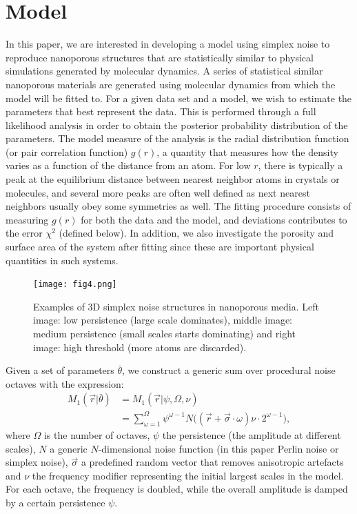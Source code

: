 \documentclass[aps,pre,twocolumn,letterpaper,floatfix,showpacs]{revtex4}
\begin{document}
\section{Model}
In this paper, we are interested in developing a model using simplex noise to reproduce
nanoporous structures that are statistically similar to physical simulations generated by molecular dynamics.
A series of statistical similar nanoporous materials are generated using molecular dynamics from which the model will be fitted to.
For a given data set and a model, we wish to estimate the parameters that best represent the data. 
This is performed through a full likelihood analysis in order to obtain the posterior probability distribution of the parameters. 
The model measure of the analysis is the radial distribution function (or pair correlation function) $g(r)$, a quantity that measures how the density varies as a function of the distance from an atom.
For low $r$, there is typically a peak at the equilibrium distance between nearest neighbor atoms in crystals or molecules, and several more peaks are often well defined as next nearest neighbors usually obey some symmetries as well.
The fitting procedure consists of measuring $g(r)$ for both the data and the model, and deviations contributes to the error $\chi^2$ (defined below).
In addition, we also investigate the porosity and surface area of the system after fitting since these are important physical quantities in such systems.

\begin{figure}
\texttt{[image: fig4.png]}
\caption{Examples of 3D simplex noise structures in nanoporous media. Left image:
low persistence (large scale dominates), middle image: medium persistence (small
scales starts dominating) and right image: high threshold (more atoms are discarded). }
\label{fig:model_example}
\end{figure}

Given a set of parameters $\bar \theta$, we construct a generic sum over procedural noise octaves with the expression:
\begin{align}
  M_1(\vec r |\bar \theta) &= M_1(\vec r | \psi, \Omega, \nu)\nonumber\\
  &= \sum_{\omega=1}^{\Omega} \psi^{\omega-1}   N\big((\vec r + \vec\sigma \cdot \omega)\nu \cdot 2^{\omega-1} \big),
\label{eq:noisemodel1}
\end{align}
where $\Omega$ is the number of octaves, $\psi$ the persistence (the amplitude at different scales),
$N$ a generic $N$-dimensional noise function (in this paper Perlin noise or simplex noise), $\vec \sigma$ a predefined random
vector that removes anisotropic artefacts and $\nu$ the frequency modifier representing
the initial largest scales in the model. For each octave, the frequency is doubled, while the overall amplitude is damped by a certain persistence $\psi$.
\end{document}
